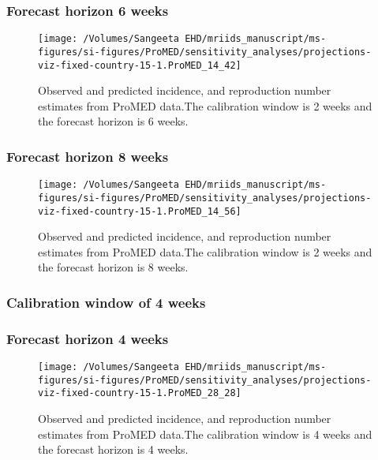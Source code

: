 \documentclass[9pt,twoside,lineno]{pnas-new}
\begin{document}
\hypertarget{forecast-horizon-6-weeks-9}{%
  \subsubsection{Forecast horizon 6 weeks}\label{forecast-horizon-6-weeks-9}}

\begin{figure}

  {\centering \texttt{[image: /Volumes/Sangeeta EHD/mriids\_manuscript/ms-figures/si-figures/ProMED/sensitivity\_analyses/projections-viz-fixed-country-15-1.ProMED\_14\_42]} 

  }

  \caption{Observed and predicted incidence, and reproduction number
    estimates from ProMED data.The calibration window is 2 weeks and
    the forecast horizon is 6 weeks.}
  \label{fig:SI-35}
\end{figure}

\hypertarget{forecast-horizon-8-weeks-9}{%
  \subsubsection{Forecast horizon 8 weeks}\label{forecast-horizon-8-weeks-9}}

\begin{figure}

  {\centering \texttt{[image: /Volumes/Sangeeta EHD/mriids\_manuscript/ms-figures/si-figures/ProMED/sensitivity\_analyses/projections-viz-fixed-country-15-1.ProMED\_14\_56]} 

  }

  \caption{Observed and predicted incidence, and reproduction number estimates from ProMED data.The calibration window is 2 weeks and the forecast horizon is 8 weeks.}\label{fig:SI-36}
\end{figure}

\hypertarget{calibration-window-of-4-weeks-3}{%
  \subsubsection{Calibration window of 4 weeks}\label{calibration-window-of-4-weeks-3}}

\hypertarget{forecast-horizon-4-weeks-9}{%
  \subsubsection{Forecast horizon 4 weeks}\label{forecast-horizon-4-weeks-9}}

\begin{figure}

  {
    \centering \texttt{[image: /Volumes/Sangeeta EHD/mriids\_manuscript/ms-figures/si-figures/ProMED/sensitivity\_analyses/projections-viz-fixed-country-15-1.ProMED\_28\_28]} 

  }

  \caption{Observed and predicted incidence, and reproduction number
    estimates from ProMED data.The calibration window is 4 weeks and
    the forecast horizon is 4 weeks.}
  \label{fig:pm44gamma}
\end{figure}
\end{document}
